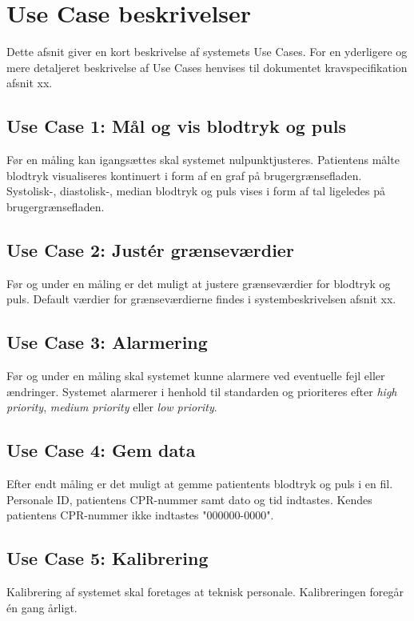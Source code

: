 \section{Use Case beskrivelser}
Dette afsnit giver en kort beskrivelse af systemets Use Cases. For en yderligere og mere detaljeret beskrivelse af Use Cases henvises til dokumentet kravspecifikation afsnit xx. 
\subsection{Use Case 1: Mål og vis blodtryk og puls}
Før en måling kan igangsættes skal systemet nulpunktjusteres. Patientens målte blodtryk visualiseres kontinuert i form af en graf på brugergrænsefladen. Systolisk-, diastolisk-, median blodtryk og puls vises i form af tal ligeledes på brugergrænsefladen.
\subsection{Use Case 2: Justér grænseværdier}
Før og under en måling er det muligt at justere grænseværdier for blodtryk og puls. Default værdier for grænseværdierne findes i systembeskrivelsen afsnit xx.
\subsection{Use Case 3: Alarmering}
Før og under en måling skal systemet kunne alarmere ved eventuelle fejl eller ændringer. Systemet alarmerer i henhold til standarden og prioriteres efter \textit{high priority}, \textit{medium priority} eller \textit{low priority}.
\subsection{Use Case 4: Gem data}
Efter endt måling er det muligt at gemme patientents blodtryk og puls i en fil. Personale ID, patientens CPR-nummer samt dato og tid indtastes. Kendes patientens CPR-nummer ikke indtastes "000000-0000".
\subsection{Use Case 5: Kalibrering}
Kalibrering af systemet skal foretages at teknisk personale. Kalibreringen foregår én gang årligt.
